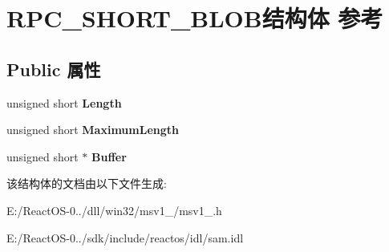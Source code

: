 \hypertarget{struct_r_p_c___s_h_o_r_t___b_l_o_b}{}\section{R\+P\+C\+\_\+\+S\+H\+O\+R\+T\+\_\+\+B\+L\+O\+B结构体 参考}
\label{struct_r_p_c___s_h_o_r_t___b_l_o_b}
\subsection*{Public 属性}
\begin{DoxyCompactItemize}
\item 
\mbox{\label{struct_r_p_c___s_h_o_r_t___b_l_o_b_aa7c5b9e0ef535df813272b84be221d6b}} 
unsigned short {\bfseries Length}
\item 
\mbox{\label{struct_r_p_c___s_h_o_r_t___b_l_o_b_aa5d0397a35b76572a965ddb8f08f2af4}} 
unsigned short {\bfseries Maximum\+Length}
\item 
\mbox{\label{struct_r_p_c___s_h_o_r_t___b_l_o_b_a2db8a3ef82c45bb5a9c79172b3614c3d}} 
unsigned short $\ast$ {\bfseries Buffer}
\end{DoxyCompactItemize}


该结构体的文档由以下文件生成\+:\begin{DoxyCompactItemize}
\item 
E\+:/\+React\+O\+S-\/0../dll/win32/msv1\+\_/msv1\+\_.\+h\item 
E\+:/\+React\+O\+S-\/0../sdk/include/reactos/idl/sam.\+idl\end{DoxyCompactItemize}
